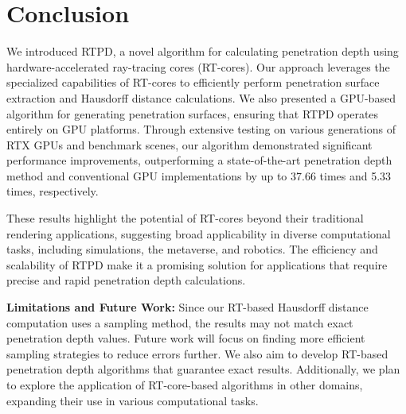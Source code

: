 \section{Conclusion}

We introduced RTPD, a novel algorithm for calculating penetration depth using hardware-accelerated ray-tracing cores (RT-cores).
Our approach leverages the specialized capabilities of RT-cores to efficiently perform penetration surface extraction and Hausdorff distance calculations.
We also presented a GPU-based algorithm for generating penetration surfaces, ensuring that RTPD operates entirely on GPU platforms.
Through extensive testing on various generations of RTX GPUs and benchmark scenes, our algorithm demonstrated significant performance improvements, outperforming a state-of-the-art penetration depth method and conventional GPU implementations by up to 37.66 times and 5.33 times, respectively.

These results highlight the potential of RT-cores beyond their traditional rendering applications, suggesting broad applicability in diverse computational tasks, including simulations, the metaverse, and robotics. 
The efficiency and scalability of RTPD make it a promising solution for applications that require precise and rapid penetration depth calculations.

\textbf{Limitations and Future Work:}
Since our RT-based Hausdorff distance computation uses a sampling method, the results may not match exact penetration depth values.
Future work will focus on finding more efficient sampling strategies to reduce errors further.
We also aim to develop RT-based penetration depth algorithms that guarantee exact results.
Additionally, we plan to explore the application of RT-core-based algorithms in other domains, expanding their use in various computational tasks.


